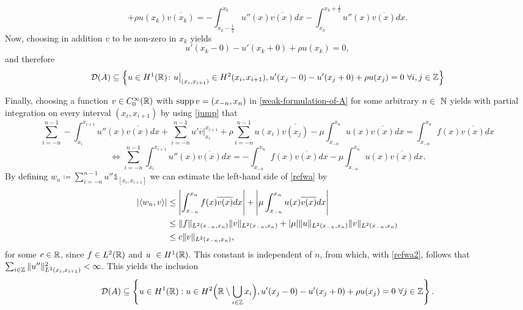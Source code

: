 	\[ +  \rho u(x_{k})\overline{v(x_{k})} = - \int_{x_{k} - \frac{1}{2}}^{x_{k}} u''(x) \overline{v(x)} dx - \int_{x_{k}}^{x_{k} + \frac{1}{2}} u''(x) \overline{v(x)} dx. \]
Now, choosing in addition $v$ to be non-zero in $x_{k}$ yields 
	\begin{equation}
		u'(x_{k}-0) - u'(x_{k}+0) + \rho u(x_{k}) = 0, \label{jump}
	\end{equation} 
and therefore
	\begin{equation}
		\mathcal{D}(A) \subseteq \Big\{ u \in H^{1}(\mathbb{R}) \colon u\big|_{(x_{i}, x_{i+1})} \in H^{2}(x_{i}, x_{i+1}), u'(x_{j} - 0) - u'(x_{j} + 0) + \rho u(x_{j}) = 0 ~\forall i, j \in \mathbb{Z} \Big\}
	\end{equation} 
	
Finally, choosing a function $v \in C_{0}^{\infty}(\mathbb{R})$ with $\operatorname{supp} v = (x_{-n}, x_{n})$ in \eqref{weak-formulation-of-A} for some arbitrary $n \in \N$ yields with partial integration on every interval $(x_{i}, x_{i+1})$ by using \eqref{jump} that
\[ \sum_{i=-n}^{n-1} -\int_{x_{i}}^{x_{i+1}} u''(x) \overline{v(x)} dx + \sum_{i=-n}^{n-1} u' \overline{v} \big|_{x_{i}}^{x_{i+1}} + \rho \sum_{i=-n}^{n-1} u(x_{i}) \overline{v(x_{j})} - \mu \int_{x_{-n}}^{x_{n}} u(x) \overline{v(x)} dx = \int_{x_{-n}}^{x_{n}} f(x) \overline{v(x)} dx \]
\begin{equation}
	\iff \sum_{i=-n}^{n-1} \int_{x_{i}}^{x_{i+1}} u''(x) \overline{v(x)} dx = - \int_{x_{-n}}^{x_{n}} f(x) \overline{v(x)} dx - \mu \int_{x_{-n}}^{x_{n}} u(x) \overline{v(x)} dx. \label{refwa}
\end{equation} 
By defining $w_{n} \coloneqq \sum_{i=-n}^{n-1} u'' \mathds{1}_{[x_{i}, x_{i+1}]}$ we can estimate the left-hand side of \eqref{refwa} by
\begin{align}
	\left| \langle w_{n}, v \rangle \right| & \leq \left| \int_{x_{-n}}^{x_{n}} f(x) \overline{v(x)} dx \right| + \left| \mu \int_{x_{-n}}^{x_{n}} u(x) \overline{v(x)} dx \right|  \notag \\
		& \leq \|f\|_{L^{2}(x_{-n}, x_{n})} \|v\|_{L^{2}(x_{-n}, x_{n})} + |\mu| \|u\|_{L^{2}(x_{-n}, x_{n})} \|v\|_{L^{2}(x_{-n}, x_{n})} \notag \\
		& \leq c \|v\|_{L^{2}(x_{-n}, x_{n})}, \label{refwa2}
\end{align}
for some $c \in \mathbb{R}$, since $f \in L^{2}(\mathbb{R})$ and $u \in H^{1}(\R)$. This constant is independent of $n$, from which, with \eqref{refwa2}, follows that $\sum_{i \in \mathbb{Z}} \|u''\|^{2}_{L^{2}(x_{i}, x_{i+1})} < \infty$. This yields the inclusion
	\begin{equation}
		\mathcal{D}(A) \subseteq \left\{ u \in H^{1}(\mathbb{R}): u \in H^{2}\Big(\mathbb{R} \setminus \bigcup_{i \in \mathbb{Z}} x_{i} \Big), u'(x_{j} - 0) - u'(x_{j} + 0) + \rho u(x_{j}) = 0 ~\forall j \in \mathbb{Z} \right\}. \label{firstdomaininclusion} 
	\end{equation}
